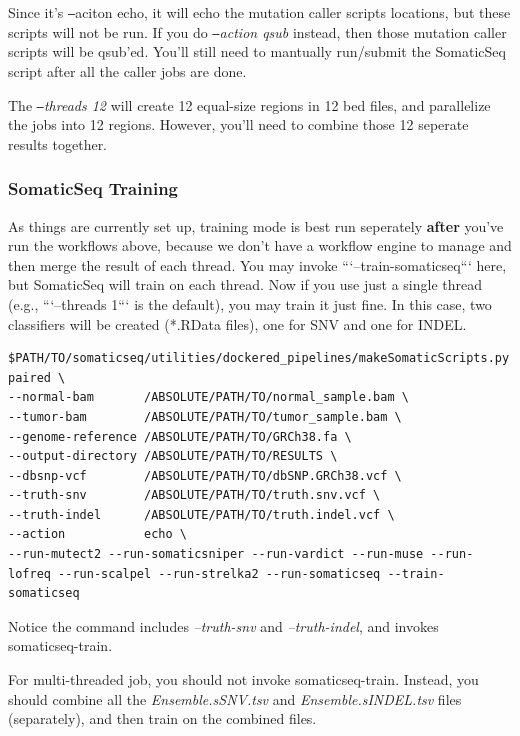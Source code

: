 \documentclass[10pt,letterpaper]{article}
\begin{document}
\begin{sloppypar}
Since it's \texttt{--}aciton echo, it will echo the mutation caller scripts locations, but these scripts will not be run. If you do \textit{\texttt{--}action qsub} instead, then those mutation caller scripts will be qsub'ed. You'll still need to mantually run/submit the SomaticSeq script after all the caller jobs are done.

The \textit{\texttt{--}threads 12} will create 12 equal-size regions in 12 bed files, and parallelize the jobs into 12 regions. However, you'll need to combine those 12 seperate results together. 




\subsubsection{SomaticSeq Training}

As things are currently set up, training mode is best run seperately \textbf{after} you've run the workflows above, because we don't have a workflow engine to manage and then merge the result of each thread. You may invoke ```--train-somaticseq``` here, but SomaticSeq will train on each thread. Now if you use just a single thread (e.g., ```--threads 1``` is the default), you may train it just fine. In this case, two classifiers will be created (*.RData files), one for SNV and one for INDEL.

\begin{lstlisting}
$PATH/TO/somaticseq/utilities/dockered_pipelines/makeSomaticScripts.py paired \
--normal-bam       /ABSOLUTE/PATH/TO/normal_sample.bam \
--tumor-bam        /ABSOLUTE/PATH/TO/tumor_sample.bam \
--genome-reference /ABSOLUTE/PATH/TO/GRCh38.fa \
--output-directory /ABSOLUTE/PATH/TO/RESULTS \
--dbsnp-vcf        /ABSOLUTE/PATH/TO/dbSNP.GRCh38.vcf \
--truth-snv        /ABSOLUTE/PATH/TO/truth.snv.vcf \
--truth-indel      /ABSOLUTE/PATH/TO/truth.indel.vcf \
--action           echo \
--run-mutect2 --run-somaticsniper --run-vardict --run-muse --run-lofreq --run-scalpel --run-strelka2 --run-somaticseq --train-somaticseq
\end{lstlisting}

Notice the command includes \textit{--truth-snv} and \textit{--truth-indel}, and invokes somaticseq-train.

For multi-threaded job, you should not invoke somaticseq-train. Instead, you should combine all the \textit{Ensemble.sSNV.tsv} and \textit{Ensemble.sINDEL.tsv} files (separately), and then train on the combined files. 





\end{sloppypar}
\end{document}
